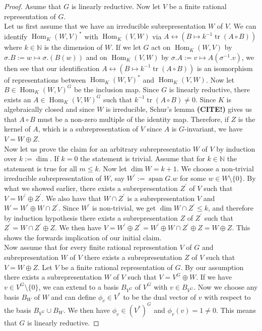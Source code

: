 \begin{proof}
  Asume that $G$ is linearly reductive.
  Now let $V$ be a finite rational representation of $G$.\\
  Let us first assume that we have an irreducible subrepresentation $W$ of $V$.
  We can identify $\operatorname{Hom}_K(W,V)^\ast$ with $\operatorname{Hom}_K(V,W)$ via  $A \leftrightarrow (B \mapsto k^{-1}\operatorname{tr}(A \circ B))$ where $k \in \mathbb{N}$ is the dimension of $W$.
  If we let $G$ act on $ \operatorname{Hom}_K(W,V)$ by $ \sigma.B :=  w \mapsto \sigma . (B(w))$ and on $\operatorname{Hom}_K(V,W)$ by $ \sigma.A := v \mapsto A(\sigma^{-1}.v) $, we then see that our identification $A \leftrightarrow (B \mapsto k^{-1}\operatorname{tr}(A \circ B))$ is an isomorphism of representations between $\operatorname{Hom}_K(W,V)^\ast$ and $\operatorname{Hom}_K(V,W)$. %
  Now let $B \in \operatorname{Hom}_K(W,V)^G$ be the inclusion map.
  Since $G$ is linearly reductive, there exists an $A \in \operatorname{Hom}_K(V,W)^G$ such that $k^{-1} \operatorname{tr}(A \circ B) \neq 0$.
  Since $K$ is algebraically closed and since $W$ is irreducible, Schur's lemma \textbf{(CITE!)} gives us that $A \circ B$ must be a non-zero multiple of the identity map.
  Therefore, if $Z$ is the kernel of $A$, which is a subrepresentation of $V$ since $A$ is $G$-invariant, we have $V = W \oplus Z$.\\
  Now let us prove the claim for an arbitrary subrepresentatio $W$ of $V$ by induction over $k := \operatorname{dim}$.
  If $k=0$ the statement is trivial.
  Assume that for $k \in \mathbb{N}$ the statement is true for all $m \leq k$.
  Now let $\operatorname{dim}W = k +1$.
  We choose a non-trivial irreducible subrepresentation of $W$, say $W^\prime := \operatorname{span}G.w$ for some $w \in W \setminus \{0\}$.
  By what we showed earlier, there exists a subrepresentation $Z^\prime$ of $V$ such that $V = W^\prime \oplus Z^\prime$.
  We also have that $W \cap Z^\prime$ is a subrepresentation $V$ and $W = W^\prime \oplus W \cap Z^\prime$.
  Since $W^\prime$ is non-trivial, we get $\operatorname{dim} W \cap Z^\prime \leq k$, and therefore by induction hypothesis there exists a subrepresentation $Z$ of $Z^\prime$ such that $Z^\prime = W \cap Z^\prime \oplus Z$.
  We then have $V = W^\prime \oplus Z^\prime = W^\prime \oplus W \cap Z^\prime \oplus Z = W \oplus Z$.
  This shows the forwards implication of our initial claim.\\  
  Now assume that for every finite rational representation $V$ of $G$ and subrepresentation $W$ of $V$ there exists a subrepresentation $Z$ of $V$ such that $V = W \oplus Z$.
  Let $V$ be a finite rational representation of $G$.
  By our assumption there exists a subrepresentation $W$ of $V$ such that $V = V^G \oplus W$.
  If we have $v \in V^G \setminus \{0\}$, we can extend to a basis $B_{V^G}$ of $V^G$ with $v \in B_{V^G}$.
  Now we choose any basis $B_W$ of $W$ and can define $\phi_v \in V^\ast$ to be the dual vector of $v$ with respect to the basis $B_{V^G} \cup B_W$.
  We then have $\phi_v \in (V^\ast)^G $ and $\phi_v (v) = 1 \neq 0$.
  This means that $G$ is linearly reductive.


\end{proof}
